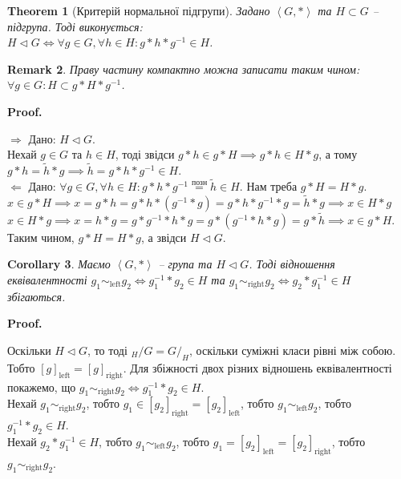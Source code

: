 \documentclass[a4paper, 10pt]{article}
\makeatletter
\theoremstyle{theoremdd}
\newtheorem{theorem}{Theorem}[subsection]
\theoremstyle{theoremdd}
\theoremstyle{theoremdd}
\theoremstyle{theoremdd}
\theoremstyle{theoremdd}
\theoremstyle{theoremdd}
\theoremstyle{theoremdd}
\theoremstyle{theoremdd}
\theoremstyle{theoremdd}
\theoremstyle{theoremdd}
\theoremstyle{theoremdd}
\newtheorem{remark}[theorem]{Remark}
\theoremstyle{theoremdd}
\theoremstyle{theoremdd}
\theoremstyle{theoremdd}
\newtheorem{corollary}[theorem]{Corollary}
\theoremstyle{theoremdd}
\renewenvironment{proof}[1][Proof.\\]{\par
\pushQED{\hfill \qed}%
\normalfont \topsep6\p@\@plus6\p@\relax
\trivlist
\item\relax
{\bfseries
#1\@addpunct{.}}\hspace\labelsep\ignorespaces
}{%
\popQED\endtrivlist\@endpefalse
}
\makeatother
\begin{document}
\begin{theorem}[Критерій нормальної підгрупи]
Задано $\left<G,* \right>$ та $H \subset G$ -- підгрупа. Тоді виконується:\\
$H \triangleleft G \iff \forall g \in G, \forall h \in H: g*h*g^{-1} \in H$.
\end{theorem}

\begin{remark}
Праву частину компактно можна записати таким чином: $\forall g \in G: H \subset g*H*g^{-1}$.
\end{remark}

\begin{proof}
$\boxed{\Rightarrow}$ Дано: $H \triangleleft G$.\\
Нехай $g \in G$ та $h \in H$, тоді звідси $g*h \in g*H \implies g*h \in H*g$, а тому $g*h = \tilde{h}*g \implies \tilde{h} = g*h*g^{-1} \in H$.
\bigskip \\
$\boxed{\Leftarrow}$ Дано: $\forall g \in G, \forall h \in H: g*h*g^{-1} \overset{\text{позн}}{=} \tilde{h} \in H$. Нам треба $g*H = H*g$.\\
$x \in g*H \implies x = g*h = g*h*(g^{-1}*g) = g*h*g^{-1}*g = \tilde{h}*g \implies x \in H*g$\\
$x \in H*g \implies x = h*g = g*g^{-1}*h*g = g*(g^{-1}*h*g) = g*\tilde{h} \implies x \in g*H$.\\
Таким чином, $g*H = H*g$, а звідси $H \triangleleft G$.
\end{proof}

\begin{corollary}
Маємо $\left< G, * \right>$ -- група та $H \triangleleft G$. Тоді відношення еквівалентності $g_1 \sim_{\text{left}} g_2 \iff g_1^{-1}*g_2 \in H$ та $g_1 \sim_{\text{right}} g_2 \iff g_2*g_1^{-1} \in H$ збігаються.
\end{corollary}

\begin{proof}
Оскільки $H \triangleleft G$, то тоді ${}_{H}/G = G/_H$, оскільки суміжні класи рівні між собою. Тобто $[g]_{\text{left}} = [g]_{\text{right}}$. Для збіжності двох різних відношень еквівалентності покажемо, що $g_1 \sim_{\text{right}} g_2 \iff g_1^{-1}*g_2 \in H$.\\
Нехай $g_1 \sim_{\text{right}} g_2$, тобто $g_1 \in [g_2]_{\text{right}} = [g_2]_{\text{left}}$, тобто $g_1 \sim_{\text{left}} g_2$, тобто $g_1^{-1}*g_2 \in H$.\\
Нехай $g_2*g_1^{-1} \in H$, тобто $g_1 \sim_{\text{left}} g_2$, тобто $g_1 = [g_2]_{\text{left}} = [g_2]_{\text{right}}$, тобто $g_1 \sim_{\text{right}} g_2$.
\end{proof}
\end{document}
